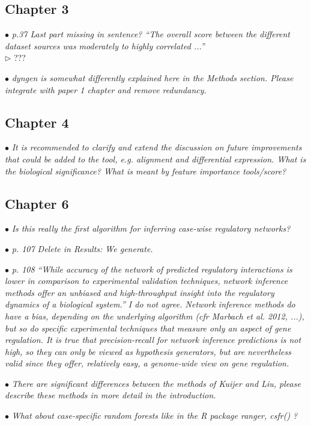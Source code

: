 \documentclass[10pt]{article}
\newcommand{\exam}[2][\  ]{\hspace{0pt}\marginpar{\color{red}#1}$\bullet$ \textit{#2}}
\newcommand{\nimp}[1]{{\color{gray} #1}}
\newcommand{\answ}[1]{{\color{blue} $\triangleright$ #1}}
\newcommand{\bigexclaim}{\raisebox{-0.1em}{\BigTriangleUp}\hspace{-0.32em}\llap{\small\textbf{!}}\hspace{0.32em}}
\newcommand{\tagimp}{\bigexclaim}
\begin{document}
{\subsection{Chapter 3}

\exam{p.37 Last part missing in sentence? “The overall score between the different dataset sources
	was moderately to highly correlated ...”} \\
\answ{???}

\exam{dyngen is somewhat differently explained here in the Methods section. Please integrate with
	paper 1 chapter and remove redundancy.}

\subsection{Chapter 4}

\exam{It is recommended to clarify and extend the discussion on future improvements that could be
	added to the tool, e.g. alignment and differential expression. What is the biological
	significance? What is meant by feature importance tools/score?}

\subsection{Chapter 6}


\exam{Is this really the first algorithm for inferring case-wise regulatory networks?}

\exam[\tagimp]{p. 107 Delete in Results: We generate.}

\exam{\nimp{p. 108 “While accuracy of the network of predicted regulatory interactions is lower in
	comparison to experimental validation techniques, network inference methods offer an
	unbiased and high-throughput insight into the regulatory dynamics of a biological system.”} I
	do not agree. Network inference methods do have a bias, depending on the underlying
	algorithm (cfr Marbach et al. 2012, ...), but so do specific experimental techniques that
	measure only an aspect of gene regulation. It is true that precision-recall for network
	inference predictions is not high, so they can only be viewed as hypothesis generators, but
	are nevertheless valid since they offer, relatively easy, a genome-wide view on gene
	regulation.}

\exam{There are significant differences between the methods of Kuijer and Liu, please describe
	these methods in more detail in the introduction.}

\exam{What about case-specific random forests like in the R package ranger, csfr() ?}
 

}
\end{document}
